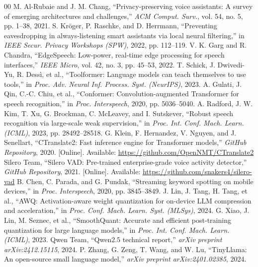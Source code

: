 \documentclass[conference]{IEEEtran}
\begin{document}
\begin{thebibliography}{00}
 M. Al-Rubaie and J. M. Chang, ``Privacy-preserving voice assistants: A survey of emerging architectures and challenges,'' \textit{ACM Comput. Surv.}, vol. 54, no. 5, pp. 1--38, 2021.
 S. Kröger, P. Raschke, and D. Herrmann, ``Preventing eavesdropping in always-listening smart assistants via local neural filtering,'' in \textit{IEEE Secur. Privacy Workshops (SPW)}, 2022, pp. 112--119.
 V. K. Garg and R. Chandra, ``EdgeSpeech: Low-power, real-time edge processing for speech interfaces,'' \textit{IEEE Micro}, vol. 42, no. 3, pp. 45--53, 2022.
 T. Schick, J. Dwivedi-Yu, R. Dessì, et al., ``Toolformer: Language models can teach themselves to use tools,'' in \textit{Proc. Adv. Neural Inf. Process. Syst. (NeurIPS)}, 2023.
 A. Gulati, J. Qin, C.-C. Chiu, et al., ``Conformer: Convolution-augmented Transformer for speech recognition,'' in \textit{Proc. Interspeech}, 2020, pp. 5036--5040.
 A. Radford, J. W. Kim, T. Xu, G. Brockman, C. McLeavey, and I. Sutskever, ``Robust speech recognition via large-scale weak supervision,'' in \textit{Proc. Int. Conf. Mach. Learn. (ICML)}, 2023, pp. 28492--28518.
 G. Klein, F. Hernandez, V. Nguyen, and J. Senellart, ``CTranslate2: Fast inference engine for Transformer models,'' \textit{GitHub Repository}, 2020. [Online]. Available: \url{https://github.com/OpenNMT/CTranslate2}
 Silero Team, ``Silero VAD: Pre-trained enterprise-grade voice activity detector,'' \textit{GitHub Repository}, 2021. [Online]. Available: \url{https://github.com/snakers4/silero-vad}
 B. Chen, C. Parada, and G. Pundak, ``Streaming keyword spotting on mobile devices,'' in \textit{Proc. Interspeech}, 2020, pp. 3845--3849.
 J. Lin, J. Tang, H. Tang, et al., ``AWQ: Activation-aware weight quantization for on-device LLM compression and acceleration,'' in \textit{Proc. Conf. Mach. Learn. Syst. (MLSys)}, 2024.
 G. Xiao, J. Lin, M. Seznec, et al., ``SmoothQuant: Accurate and efficient post-training quantization for large language models,'' in \textit{Proc. Int. Conf. Mach. Learn. (ICML)}, 2023.
 Qwen Team, ``Qwen2.5 technical report,'' \textit{arXiv preprint arXiv:2412.15115}, 2024.
 P. Zhang, G. Zeng, T. Wang, and W. Lu, ``TinyLlama: An open-source small language model,'' \textit{arXiv preprint arXiv:2401.02385}, 2024.

\end{thebibliography}
\end{document}
